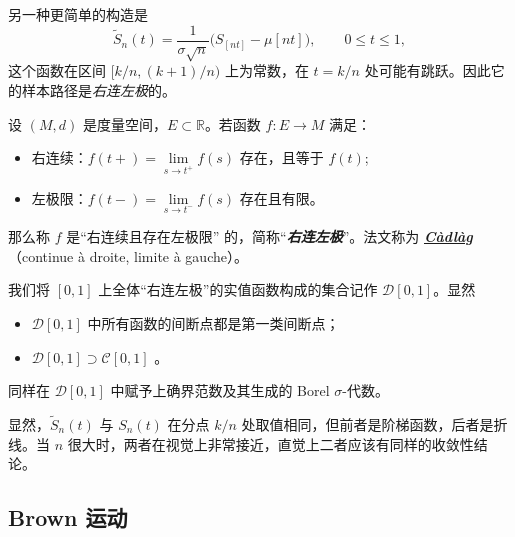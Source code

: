 另一种更简单的构造是
\[\widetilde S_n(t) = \frac{1}{\sigma\sqrt{n}} \bigl( S_{[nt]} - \mu [nt] \bigr), \qquad 0 \le t \le 1,\]
这个函数在区间 $[k/n, (k+1)/n)$ 上为常数，在 $t = k/n$ 处可能有跳跃。因此它的样本路径是\emph{右连左极}的。

\begin{definition*}[右连左极函数]
设 $(M,d)$ 是度量空间，$E\subset\mathbb R$。若函数 $f:E\to M$ 满足：

\begin{itemize}
\tightlist
\item
  右连续：$f(t+)=\lim\limits_{s\to t^+} f(s)$ 存在，且等于 $f(t)$;
\item
  左极限：$f(t-)=\lim\limits_{s\to t^-} f(s)$ 存在且有限。
\end{itemize}

那么称 $f$ 是``右连续且存在左极限'' 的，简称``\textbf{\emph{右连左极}}''。法文称为 \textbf{\emph{\href{https://en.wikipedia.org/wiki/C\%C3\%A0dl\%C3\%A0g}{Càdlàg}}} （continue à droite, limite à gauche）。
\end{definition*}

我们将 $[0,1]$ 上全体``右连左极''的实值函数构成的集合记作 $\mathcal D[0,1]$。显然

\begin{itemize}
\tightlist
\item
  $\mathcal D[0,1]$ 中所有函数的间断点都是第一类间断点；
\item
  $\mathcal D[0,1]\supset \mathcal C[0,1]$ 。
\end{itemize}

同样在 $\mathcal D[0,1]$ 中赋予上确界范数及其生成的 Borel $\sigma$-代数。

显然，$\widetilde S_n(t)$ 与 $S_n(t)$ 在分点 $k/n$ 处取值相同，但前者是阶梯函数，后者是折线。当 $n$ 很大时，两者在视觉上非常接近，直觉上二者应该有同样的收敛性结论。

\subsection{Brown 运动}

